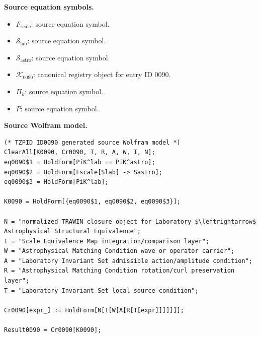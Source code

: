 \begin{minipage}[t]{0.49\linewidth}
\begingroup
\small
\raggedright
\textbf{Source equation symbols.}\par
\begin{itemize}[leftmargin=1.35em,itemsep=1pt,topsep=1pt,parsep=0pt]
    \item $F_{\mathrm{scale}}$: source equation symbol.
    \item $\mathcal{S}_{\mathrm{lab}}$: source equation symbol.
    \item $\mathcal{S}_{\mathrm{astro}}$: source equation symbol.
    \item $\mathcal{K}_{0090}$: canonical registry object for entry ID 0090.
    \item $\Pi_{k}$: source equation symbol.
    \item $P$: source equation symbol.
\end{itemize}
\endgroup
\end{minipage}\hfill
\begin{minipage}[t]{0.47\linewidth}
\begingroup
\scriptsize
\raggedright
\textbf{Source Wolfram model.}\par
\begin{Verbatim}[fontsize=\tiny,breaklines=true,breakanywhere=true]
(* TZPID ID0090 generated source Wolfram model *)
ClearAll[K0090, Cr0090, T, R, A, W, I, N];
eq0090$1 = HoldForm[PiK^lab == PiK^astro];
eq0090$2 = HoldForm[Fscale[Slab] -> Sastro];
eq0090$3 = HoldForm[PiK^lab];

K0090 = HoldForm[{eq0090$1, eq0090$2, eq0090$3}];

N = "normalized TRAWIN closure object for Laboratory $\leftrightarrow$ Astrophysical Structural Equivalence";
I = "Scale Equivalence Map integration/comparison layer";
W = "Astrophysical Matching Condition wave or operator carrier";
A = "Laboratory Invariant Set admissible action/amplitude condition";
R = "Astrophysical Matching Condition rotation/curl preservation layer";
T = "Laboratory Invariant Set local source condition";

Cr0090[expr_] := HoldForm[N[I[W[A[R[T[expr]]]]]]];

Result0090 = Cr0090[K0090];
\end{Verbatim}
\endgroup
\end{minipage}

